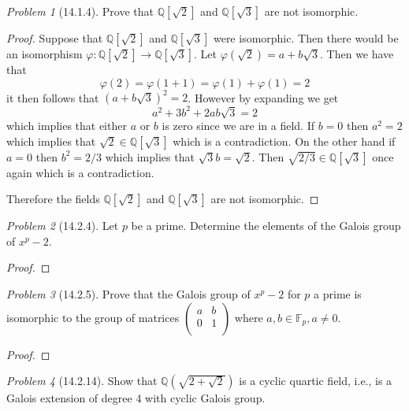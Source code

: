\documentclass[10pt]{article}
\newcommand{\sk}{\vskip 10mm}
\newcommand{\bb}[1]{\mathbb{#1}}
\theoremstyle{remark}
\newtheorem{problem}{Problem}
\theoremstyle{remark}
\begin{document}
\begin{problem}[14.1.4]
  Prove that $\bb{Q}[\sqrt{2}]$ and $\bb{Q}[\sqrt{3}]$ are not isomorphic.
\end{problem}

\begin{proof}
  Suppose that $\bb{Q}[\sqrt{2}]$ and $\bb{Q}[\sqrt{3}]$ were isomorphic.
  Then there would be an isomorphism $\varphi:\bb{Q}[\sqrt{2}]\rightarrow\bb{Q}[\sqrt{3}]$.
  Let $\varphi(\sqrt{2})=a+b\sqrt{3}$. Then we have that
  \[ \varphi(2)=\varphi(1+1)=\varphi(1)+\varphi(1)=2\]
  it then follows that $(a+b\sqrt{3})^2=2$. However by expanding we get
  \[ a^2+3b^2+2ab\sqrt{3}=2 \]
  which implies that either $a$ or $b$ is zero since we are in a field.
  If $b=0$ then $a^2=2$ which implies that $\sqrt{2}\in\bb{Q}[\sqrt{3}]$ which is
  a contradiction. On the other hand if $a=0$ then $b^2=2/3$ which
  implies that $\sqrt{3}b=\sqrt{2}$. Then $\sqrt{2/3}\in\bb{Q}[\sqrt{3}]$
  once again which is a contradiction.

  Therefore the fields $\bb{Q}[\sqrt{2}]$ and $\bb{Q}[\sqrt{3}]$ are
  not isomorphic.
\end{proof}

\sk

\begin{problem}[14.2.4]
  Let $p$ be a prime. Determine the elements of the Galois group of $x^p-2$.
\end{problem}

\begin{proof}
  
\end{proof}

\sk

\begin{problem}[14.2.5]
  Prove that the Galois group of $x^p-2$ for $p$ a prime is isomorphic to
  the group of matrices $\left(\begin{array}{cc}a&b\\0&1\\ \end{array}\right)$
  where $a,b\in\bb{F}_p,a\neq 0$.
\end{problem}

\begin{proof}
  
\end{proof}

\sk

\begin{problem}[14.2.14]
  Show that $\bb{Q}(\sqrt{2+\sqrt{2}})$ is a cyclic quartic field,
  i.e., is a Galois extension of degree 4 with cyclic Galois group.
\end{problem}
\end{document}

